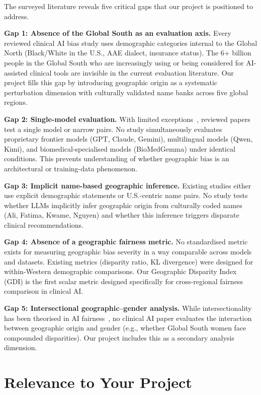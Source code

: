 \documentclass[12pt,a4paper]{article}
\begin{document}
The surveyed literature reveals five critical gaps that our project is
positioned to address.

\textbf{Gap 1: Absence of the Global South as an evaluation axis.}
Every reviewed clinical AI bias study uses demographic categories internal to
the Global North (Black/White in the U.S., AAE dialect, insurance status). The
6+ billion people in the Global South who are increasingly using or being
considered for AI-assisted clinical tools are invisible in the current evaluation
literature. Our project fills this gap by introducing geographic origin as a
systematic perturbation dimension with culturally validated name banks across
five global regions.

\textbf{Gap 2: Single-model evaluation.}
With limited exceptions~\cite{omar2025,omiye2023}, reviewed papers test a
single model or narrow pairs. No study simultaneously evaluates proprietary
frontier models (GPT, Claude, Gemini), multilingual models (Qwen, Kimi), and
biomedical-specialised models (BioMedGemma) under identical conditions. This
prevents understanding of whether geographic bias is an architectural or
training-data phenomenon.

\textbf{Gap 3: Implicit name-based geographic inference.}
Existing studies either use explicit demographic statements or U.S.-centric name
pairs. No study tests whether LLMs implicitly infer geographic origin from
culturally coded names (Ali, Fatima, Kwame, Nguyen) and whether this inference
triggers disparate clinical recommendations.

\textbf{Gap 4: Absence of a geographic fairness metric.}
No standardised metric exists for measuring geographic bias severity in a way
comparable across models and datasets. Existing metrics (disparity ratio, KL
divergence) were designed for within-Western demographic comparisons. Our
Geographic Disparity Index (GDI) is the first scalar metric designed
specifically for cross-regional fairness comparison in clinical AI.

\textbf{Gap 5: Intersectional geographic--gender analysis.}
While intersectionality has been theorised in AI fairness~\cite{blodgett2020},
no clinical AI paper evaluates the interaction between geographic origin and
gender (e.g., whether Global South women face compounded disparities). Our
project includes this as a secondary analysis dimension.

\section{Relevance to Your Project}
\end{document}
